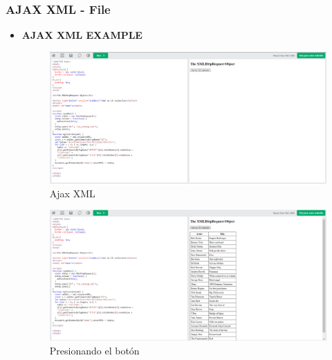 \documentclass{article}
\begin{document}
	\subsubsection{AJAX XML - File}
	\begin{itemize}
		\item \textbf{AJAX XML EXAMPLE}
		\begin{figure}[H]
			\centering
			\includegraphics[width=1\textwidth,keepaspectratio]{img/ejemplo14.png}
			\caption{Ajax XML}
		\end{figure}
		\begin{figure}[H]
			\centering
			\includegraphics[width=1\textwidth,keepaspectratio]{img/boton14.png}
			\caption{Presionando el botón}
		\end{figure}
	\end{itemize}
	\newpage
\end{document}
